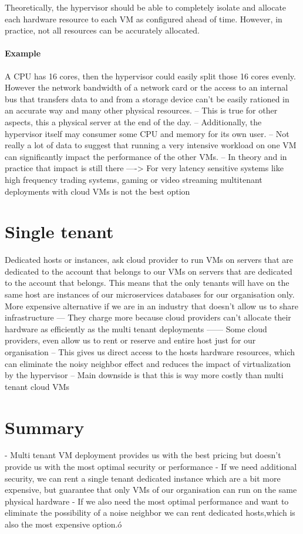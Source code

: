 \documentclass[a4paper, 11pt]{book}
\begin{document}
    Theoretically, the hypervisor should be able to completely isolate and allocate each hardware resource to each VM as configured ahead of time.
    However, in practice, not all resources can be accurately allocated.

    \paragraph{Example}
    A CPU has 16 cores, then the hypervisor could easily split those 16 cores evenly.
    However the network bandwidth of a network card or the access to an internal bus that transfers data to and from a storage device can't be easily rationed in an accurate way and many other physical resources.
    -- This is true for other aspects, this a physical server at the end of the day.
    -- Additionally, the hypervisor itself may consumer some CPU and memory for its own user.
    -- Not really a lot of data to suggest that running a very intensive workload on one VM can significantly impact the performance of the other VMs.
    -- In theory and in practice that impact is still there
    ----> For very latency sensitive systems like high frequency trading systems, gaming or video streaming multitenant deployments with cloud VMs is not the best option


    \section{Single tenant}
    Dedicated hosts or instances, ask cloud provider to run VMs on servers that are dedicated to the account that belongs to our VMs on servers that are dedicated to the account that belongs.
    This means that the only tenants will have on the same host are instances of our microservices databases for our organisation only.
    More expensive alternative if we are in an industry that doesn't allow us to share infrastructure
    --- They charge more because cloud providers can't allocate their hardware as efficiently as the multi tenant deployments
    ------ Some cloud providers, even allow us to rent or reserve and entire host just for our organisation
    -- This gives us direct access to the hosts hardware resources, which can eliminate the noisy neighbor effect and reduces the impact of virtualization by the hypervisor
    -- Main downside is that this is way more costly than multi tenant cloud VMs


    \section{Summary}
    - Multi tenant VM deployment provides us with the best pricing but doesn't provide us with the most optimal security or performance
    - If we need additional security, we can rent a single tenant dedicated instance which are a bit more expensive, but guarantee that only VMs of our organisation can run on the same physical hardware
    - If we also need the most optimal performance and want to eliminate the possibility of a noise neighbor we can rent dedicated hosts,which is also the most expensive option.ó
\end{document}
